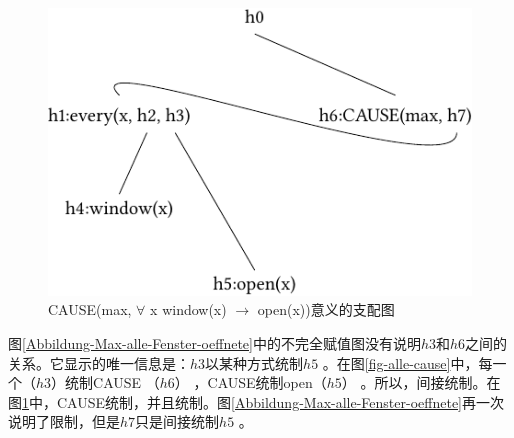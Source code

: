 \begin{figure}
\centering

\includegraphics{Figures/solution-mrs-cause-all-open-cropped.pdf}
\caption{CAUSE(max, $\forall$ x window(x) $\to$ open(x))意义的支配图\label{fig-cause-alle}}
\end{figure}%
图\ref{Abbildung-Max-alle-Fenster-oeffnete}中的不完全赋值图没有说明$h3$和$h6$之间的关系。它显示的唯一信息是：$h3$以某种方式统制$h5$ 。在图\ref{fig-alle-cause}中，每一个（$h3$）统制CAUSE （$h6$） ，CAUSE统制open（$h5$） 。所以，间接统制。在图\ref{fig-cause-alle}中，CAUSE统制，并且统制。图\ref{Abbildung-Max-alle-Fenster-oeffnete}再一次说明了限制，但是$h7$只是间接统制$h5$ 。

